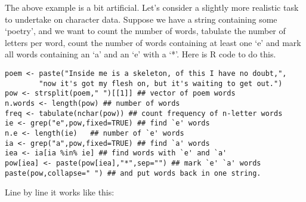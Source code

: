 \documentclass[10pt] {article}
\theoremstyle{definition}
\begin{document}
The above example is a bit artificial. Let's consider a slightly more realistic task to undertake on character data. Suppose we have a string containing  some `poetry', and we want to count the number of words, tabulate the number of letters per word, count the number of words containing at least one `e' and mark all words containing an `a' and an `e' with a `*'. Here is R code to do this.
\begin{verbatim}
poem <- paste("Inside me is a skeleton, of this I have no doubt,",
        "now it's got my flesh on, but it's waiting to get out.")
pow <- strsplit(poem," ")[[1]] ## vector of poem words
n.words <- length(pow) ## number of words
freq <- tabulate(nchar(pow)) ## count frequency of n-letter words
ie <- grep("e",pow,fixed=TRUE) ## find `e' words
n.e <- length(ie)   ## number of `e' words
ia <- grep("a",pow,fixed=TRUE) ## find `a' words
iea <- ia[ia %in% ie] ## find words with `e' and `a'
pow[iea] <- paste(pow[iea],"*",sep="") ## mark `e' `a' words
paste(pow,collapse=" ") ## and put words back in one string.
\end{verbatim}
Line by line it works like this:
\end{document}
